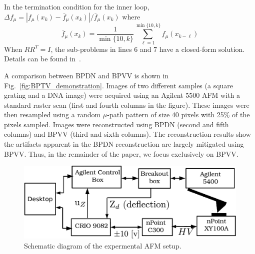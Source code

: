 \documentclass[twocolumn,oneside]{IEEEtran/IEEEtran}
\begin{document}
In the termination condition for the inner loop, $\Delta f_{\mu} = |f_{\mu}(x_k) - \bar{f}_{\mu}(x_k)|/\bar{f}_{\mu}(x_k)$ where
\begin{equation}
\bar{f}_{\mu}(x_k) = \frac{1}{\min\{10, k\}} \sum_{\ell=1}^{\min\{10,k\}} f_{\mu}(x_{k-\ell})
\end{equation}
When $RR^T=I$, the sub-problems in lines 6 and 7 have a closed-form solution. Details can be found in~\cite{becker_nesta_2011}.



A comparison between BPDN and BPVV is shown in
Fig.~\ref{fig:BPTV_demonstration}. Images of two different samples
(a square grating and a DNA image) were acquired using an Agilent 5500
AFM with a standard raster scan (first and fourth columns in the figure). These
images were then resampled using a random $\mu$-path pattern of size 40 pixels
with 25\% of the pixels sampled. Images were reconstructed using BPDN (second
and fifth columns) and BPVV (third and sixth columns). The reconstruction
results show the artifacts apparent in the BPDN reconstruction are largely
mitigated using BPVV. Thus, in the remainder of the paper, we focus exclusively on BPVV.
	
\begin{figure}[ht!]
  \includegraphics[width=1\columnwidth]{figures/exp_setup.pdf}
  \caption{Schematic diagram of the expermental AFM setup.}
  \label{fig:exp_setup}
\end{figure}
\end{document}
